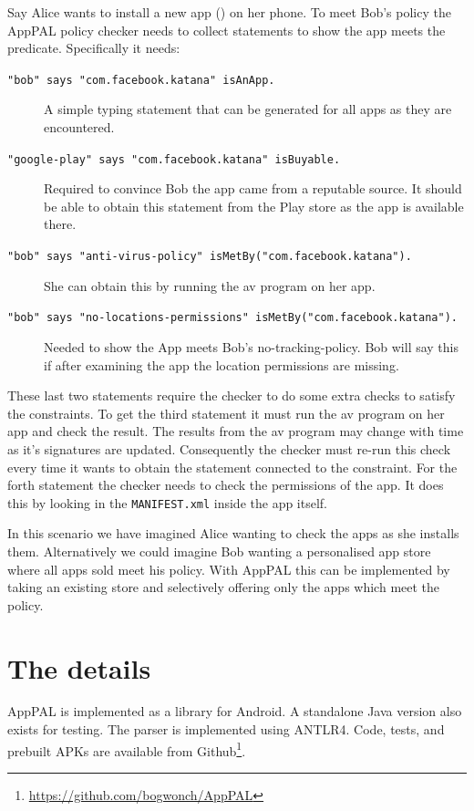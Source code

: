 \documentclass[a4paper]{scrartcl}
\newcommand{\comment}[1]{}%
\begin{document}
Say Alice wants to install a new app () on her phone.
To meet Bob's policy the AppPAL policy checker needs to collect statements to show the app meets the  predicate.
Specifically it needs:
\begin{description}
  \item[\texttt{"bob" says "com.facebook.katana" isAnApp.}] 
    A simple typing statement that can be generated for all apps as they are encountered.
  \item[\texttt{"google-play" says "com.facebook.katana" isBuyable.}] 
    Required to convince Bob the app came from a reputable source. 
    It should be able to obtain this statement from the Play store as the app is available there.
  \item[\texttt{"bob" says "anti-virus-policy" isMetBy("com.facebook.katana").}]
    She can obtain this by running the \ac{av} program on her app.
  \item[\texttt{"bob" says "no-locations-permissions" isMetBy("com.facebook.katana").}]
    Needed to show the App meets Bob's no-tracking-policy.
    Bob will say this if after examining the app the location permissions are missing.
\end{description}
These last two statements require the checker to do some extra checks to satisfy the constraints.
To get the third statement it must run the \ac{av} program on her app and check the result.
The results from the \ac{av} program may change with time as it's signatures are updated.  
Consequently the checker must re-run this check every time it wants to obtain the statement connected to the constraint.
For the forth statement the checker needs to check the permissions of the app.
It does this by looking in the \texttt{MANIFEST.xml} inside the app itself.

In this scenario we have imagined Alice wanting to check the apps as she installs them.
Alternatively we could imagine Bob wanting a personalised app store where all apps sold meet his policy.
With AppPAL this can be implemented by taking an existing store and selectively offering only the apps which meet the policy.


\section{The details \comment{5 pages}}
\label{sec:details}

AppPAL is implemented as a library for Android. 
A standalone Java version also exists for testing.  
The parser is implemented using ANTLR4.
Code, tests, and prebuilt APKs are available from Github\footnote{\url{https://github.com/bogwonch/AppPAL}}.
\end{document}
